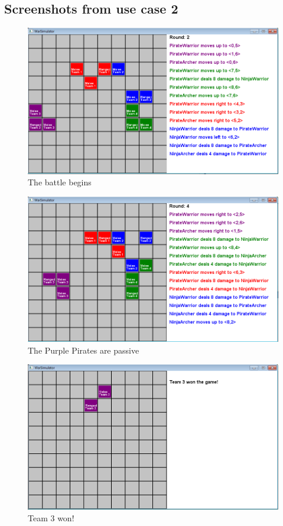 	\subsection*{Screenshots from use case 2}
		\begin{figure}[H]
		\label{pic:case21}
			\center
			\includegraphics[scale=0.6]{rapport/7/figures/case2-1.png}
			\caption{The battle begins}
		\end{figure}
		\begin{figure}[H]
		\label{pic:case22}
		\center
			\includegraphics[scale=0.6]{rapport/7/figures/case2-2.png}
			\caption{The Purple Pirates are passive}
		\end{figure}
		\begin{figure}[H]
		\label{pic:case23}
		\center
			\includegraphics[scale=0.6]{rapport/7/figures/case2-3.png}
			\caption{Team 3 won!}
		\end{figure}
	
